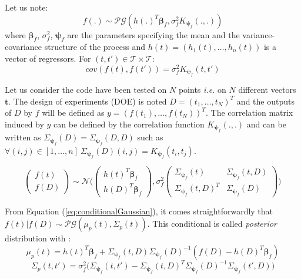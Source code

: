 \documentclass[soumission]{jsfds}
\edef\hc{\string: }
\begin{document}
\begin{appendices}
Let us note\hc
\begin{equation}
f(.) \sim \mathcal{PG}(h(.)^T\boldsymbol{\beta}_f,\sigma_f^2K_{\boldsymbol{\psi}_f}(.,.))
\end{equation}
where $\boldsymbol{\beta}_f$, $\sigma_f^2$, $\boldsymbol{\psi}_f$ are the parameters specifying the mean and the variance-covariance structure of the process and $h(t)=(h_1(t),\dots,h_n(t))$ is a vector of regressors. For $(t,t')\in \mathcal{T}\times\mathcal{T}$\hc
\begin{equation}
cov(f(t),f(t'))=\sigma_f^2K_{\boldsymbol{\psi}_f}(t,t')
\end{equation}

Let us consider the code have been tested on $N$ points \textit{i.e.} on $N$ different vectors $\bm{t}$. The design of experiments (DOE) is noted $D=(t_1,\dots,t_N)^T$ and the outputs of $D$ by $f$ will be defined as $y=(f(t_1),\dots,f(t_N))^T$. The correlation matrix  induced by $y$ can be defined by the correlation function $K_{\boldsymbol{\psi}_f}(.,.)$ and can be written as $\Sigma_{\boldsymbol{\psi}_f}(D)=\Sigma_{\boldsymbol{\psi}_f}(D,D)$ such as $\forall (i,j) \in [1,\dots,n] \  \Sigma_{\boldsymbol{\psi}_f}(D)(i,j)=K_{\boldsymbol{\psi}_f}(t_i,t_j)$.

\begin{equation}
\begin{pmatrix}
f(t)\\
f(D)
\end{pmatrix} \sim \mathcal{N}\Big( \begin{pmatrix}
h(t)^T\boldsymbol{\beta}_f\\
h(D)^T\boldsymbol{\beta}_f
\end{pmatrix}, \sigma_f^2\begin{pmatrix}
\Sigma_{\boldsymbol{\psi}_f}(t) &  \Sigma_{\boldsymbol{\psi}_f}(t,D) \\
\Sigma_{\boldsymbol{\psi}_f}(t,D)^T & \Sigma_{\boldsymbol{\psi}_f}(D)
\end{pmatrix}\Big)
\label{eq:Conditionnal}
\end{equation}

From Equation (\ref{eq:conditionalGaussian}), it comes straightforwardly that $f(t)|f(D)\sim\mathcal{PG}(\mu_p(t),\Sigma_p(t))$. This conditional is called \textit{posterior} distribution with \hc
\begin{equation*}
\mu_p(t)=h(t)^T\boldsymbol{\beta}_f+\Sigma_{\boldsymbol{\psi}_f}(t,D)\Sigma_{\boldsymbol{\psi}_f}(D)^{-1}(f(D)-h(D)^T\boldsymbol{\beta}_f)
\end{equation*} 
\begin{equation*}
\Sigma_p(t,t')=\sigma_f^2\Big(\Sigma_{\boldsymbol{\psi}_f}(t,t')-\Sigma_{\boldsymbol{\psi}_f}(t,D)^T\Sigma_{\boldsymbol{\psi}_f}(D)^{-1}\Sigma_{\boldsymbol{\psi}_f}(t',D)\Big)
\end{equation*}


\end{appendices}
\end{document}

